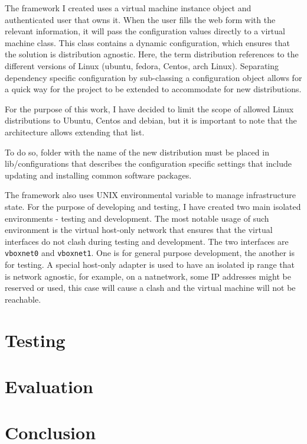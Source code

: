 \documentclass{article}
\begin{document}
The framework I created uses a virtual machine instance object and authenticated user that owns it. When the user fills the web form with the relevant information, it will pass the configuration values directly to a virtual machine class. This class contains a dynamic configuration, which ensures that the solution is distribution agnostic. Here, the term distribution references to the different versions of Linux (ubuntu, fedora, Centos, arch Linux). Separating dependency specific configuration by sub-classing a configuration object allows for a quick way for the project to be extended to accommodate for new distributions. 

For the purpose of this work, I have decided to limit the scope of allowed Linux distributions to Ubuntu, Centos and debian, but it is important to note that the architecture allows extending that list.

To do so, folder with the name of the new distribution must be placed in lib/configurations that describes the configuration specific settings that include updating and installing common software packages.

The framework also uses UNIX environmental variable to manage infrastructure state. For the  purpose of developing and testing, I have created two main isolated environments - testing and development.
The most notable usage of such environment is the virtual host-only network that ensures that the virtual interfaces do not clash during testing and development. The two interfaces are \texttt{vboxnet0} and \texttt{vboxnet1}. One is for general purpose development, the another is for testing. A special host-only adapter is used to have an isolated ip range that is network agnostic, for example, on a \gls{natnetwork}, some IP addresses might be reserved or used, this case will cause a clash and the virtual machine will not be reachable.

  \newpage
  

  \newpage
  \section{Testing}

  \newpage
  \section{Evaluation}

  \newpage
  \section{Conclusion}
\end{document}
